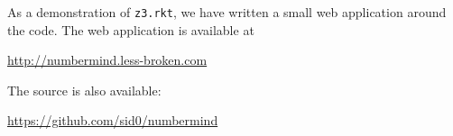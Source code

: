 As a demonstration of \texttt{z3.rkt}, we have written a small web application
around the code. The web application is available at

\begin{center}
\url{http://numbermind.less-broken.com}
\end{center}

The source is also available:

\begin{center}
\url{https://github.com/sid0/numbermind}
\end{center}
